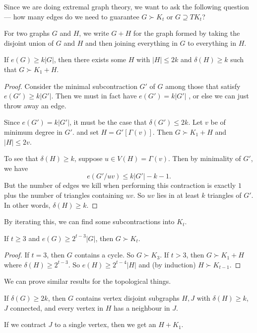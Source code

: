 \documentclass[a4paper]{article}
\begin{document}
Since we are doing extremal graph theory, we want to ask the following question --- how many edges do we need to guarantee $G \succ K_t$ or $G \supseteq TK_t$?

For two graphs $G$ and $H$, we write $G + H$ for the graph formed by taking the disjoint union of $G$ and $H$ and then joining everything in $G$ to everything in $H$.
\begin{lemma}
  If $e(G) \geq k|G|$, then there exists some $H$ with $|H| \leq 2k$ and $\delta(H) \geq k$ such that $G \succ K_1 + H$.
\end{lemma}

\begin{proof}
  Consider the minimal subcontraction $G'$ of $G$ among those that satisfy $e(G') \geq k |G'|$. Then we must in fact have $e(G') = k|G'|$ , or else we can just throw away an edge.

  Since $e(G') = k|G'|$, it must be the case that $\delta(G') \leq 2k$. Let $v$ be of minimum degree in $G'$. and set $H = G'[\Gamma(v)]$. Then $G \succ K_1 + H$ and $|H| \leq 2v$.

  To see that $\delta(H) \geq k$, suppose $u \in V(H) = \Gamma(v)$. Then by minimality of $G'$, we have
  \[
    e(G'/uv) \leq k|G'| - k - 1.
  \]
  But the number of edges we kill when performing this contraction is exactly $1$ plus the number of triangles containing $uv$. So $uv$ lies in at least $k$ triangles of $G'$. In other words, $\delta(H) \geq k$.
\end{proof}

By iterating this, we can find some subcontractions into $K_t$.
\begin{thm}
  If $t \geq 3$ and $e(G) \geq 2^{t - 3}|G|$, then $G \succ K_t$.
\end{thm}

\begin{proof}
  If $t = 3$, then $G$ contains a cycle. So $G \succ K_3$. If $t > 3$, then $G \succ K_1 + H$ where $\delta(H) \geq 2^{t - 3}$. So $e(H) \geq 2^{t - 4} |H|$ and (by induction) $H \succ K_{t - 1}$.
\end{proof}

We can prove similar results for the topological things.
\begin{lemma}
  If $\delta(G) \geq 2k$, then $G$ contains vertex disjoint subgraphs $H, J$ with $\delta(H) \geq k$, $J$ connected, and every vertex in $H$ has a neighbour in $J$.
\end{lemma}
If we contract $J$ to a single vertex, then we get an $H + K_1$.
\end{document}
